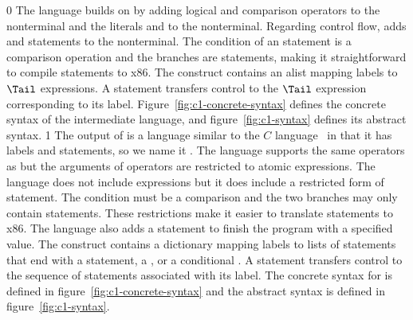 \documentclass[7x10]{TimesAPriori_MIT}%
\def\racketEd{0}
\def\pythonEd{1}
\def\edition{0}
\numberwithin{theorem}{chapter}
\numberwithin{definition}{chapter}
\numberwithin{equation}{chapter}
\begin{document}
{\if\edition\racketEd
%
The \LangCIf{} language builds on \LangCVar{} by adding logical and
comparison operators to the \Exp{} nonterminal and the literals
\TRUE{} and \FALSE{} to the \Arg{} nonterminal.  Regarding control
flow, \LangCIf{} adds  and  statements to the
\Tail{} nonterminal. The condition of an  statement is a
comparison operation and the branches are  statements,
making it straightforward to compile  statements to x86.  The
 construct contains an alist mapping labels to $\Tail$
expressions. A  statement transfers control to the $\Tail$
expression corresponding to its label.
%
Figure~\ref{fig:c1-concrete-syntax} defines the concrete syntax of the
\LangCIf{} intermediate language, and figure~\ref{fig:c1-syntax}
defines its abstract syntax.
%
\fi}
%
{\if\edition\pythonEd
%
The output of  is a language similar to the
$C$ language~\citep{Kernighan:1988nx} in that it has labels and
 statements, so we name it \LangCIf{}.  
%
The \LangCIf{} language supports the same operators as \LangIf{} but
the arguments of operators are restricted to atomic expressions. The
\LangCIf{} language does not include  expressions but it does
include a restricted form of  statement. The condition must be
a comparison and the two branches may only contain 
statements. These restrictions make it easier to translate 
statements to x86.  The \LangCIf{} language also adds a 
statement to finish the program with a specified value.
%
The  construct contains a dictionary mapping labels to
lists of statements that end with a  statement, a
, or a conditional .
%
A  statement transfers control to the sequence of statements
associated with its label.
%
The concrete syntax for \LangCIf{} is defined in
figure~\ref{fig:c1-concrete-syntax} and the abstract syntax is defined
in figure~\ref{fig:c1-syntax}.
%
\fi}
%

\newcommand{\CifGrammarRacket}{
\begin{array}{lcl}
\Atm &::=& \itm{bool} \\
\itm{cmp} &::= & \code{eq?} \MID \code{<} \MID \code{<=} \MID \code{>} \MID \code{>=} \\
\Exp &::=& \CNOT{\Atm} \MID \LP \itm{cmp}~\Atm~\Atm\RP \\
\Tail &::= & \key{goto}~\itm{label}\key{;}\\
   &\MID& \key{if}~\LP \itm{cmp}~\Atm~\Atm \RP~ \key{goto}~\itm{label}\key{;} ~\key{else}~\key{goto}~\itm{label}\key{;} 
\end{array}
}
\end{document}
